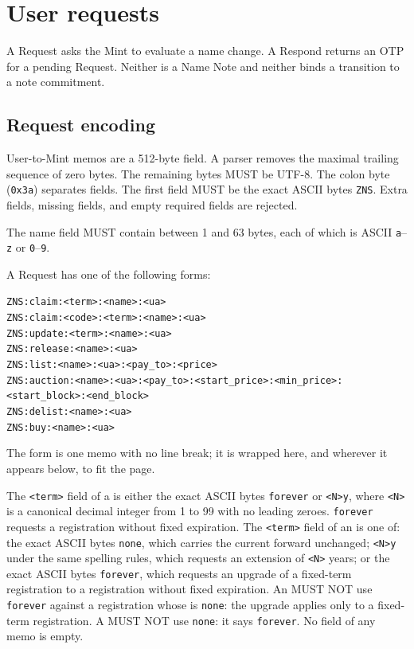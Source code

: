 \section{User requests}
\label{sec:requests}

A Request asks the Mint to evaluate a name change. A Respond returns an OTP for a pending Request. Neither is a Name Note and neither binds a transition to a note commitment.

\subsection{Request encoding}

User-to-Mint memos are a 512-byte field. A parser removes the maximal trailing sequence of zero bytes. The remaining bytes MUST be UTF-8. The colon byte (\texttt{0x3a}) separates fields. The first field MUST be the exact ASCII bytes \texttt{ZNS}. Extra fields, missing fields, and empty required fields are rejected.

The name field MUST contain between 1 and 63 bytes, each of which is ASCII \texttt{a}--\texttt{z} or \texttt{0}--\texttt{9}.

A Request has one of the following forms:

\begin{center}
\texttt{ZNS:claim:<term>:<name>:<ua>}\\
\texttt{ZNS:claim:<code>:<term>:<name>:<ua>}\\
\texttt{ZNS:update:<term>:<name>:<ua>}\\
\texttt{ZNS:release:<name>:<ua>}\\
\texttt{ZNS:list:<name>:<ua>:<pay\_to>:<price>}\\
\texttt{ZNS:auction:<name>:<ua>:<pay\_to>:<start\_price>:<min\_price>:}\\
\texttt{<start\_block>:<end\_block>}\\
\texttt{ZNS:delist:<name>:<ua>}\\
\texttt{ZNS:buy:<name>:<ua>}
\end{center}

The  form is one memo with no line break; it is wrapped here, and wherever it appears below, to fit the page.

The \texttt{<term>} field of a  is either the exact ASCII bytes \texttt{forever} or \texttt{<N>y}, where \texttt{<N>} is a canonical decimal integer from 1 to 99 with no leading zeroes. \texttt{forever} requests a registration without fixed expiration. The \texttt{<term>} field of an  is one of: the exact ASCII bytes \texttt{none}, which carries the current  forward unchanged; \texttt{<N>y} under the same spelling rules, which requests an extension of \texttt{<N>} years; or the exact ASCII bytes \texttt{forever}, which requests an upgrade of a fixed-term registration to a registration without fixed expiration. An  MUST NOT use \texttt{forever} against a registration whose  is \texttt{none}: the upgrade applies only to a fixed-term registration. A  MUST NOT use \texttt{none}: it says \texttt{forever}. No field of any memo is empty.

